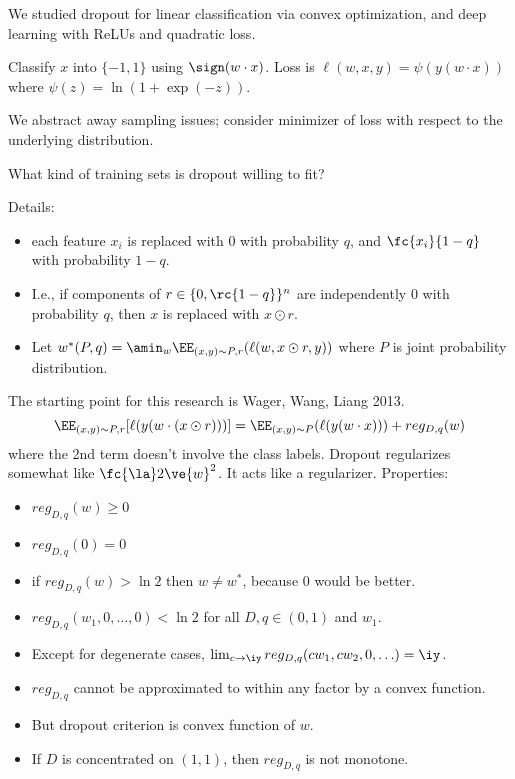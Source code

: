 We studied dropout for linear classification via convex optimization, and deep learning with ReLUs and quadratic loss.

Classify $x$ into $\{-1,1\}$ using $\sign(w\cdot x)$. Loss is $\ell(w,x,y) = \psi(y(w\cdot x))$ where $\psi(z) =\ln (1+\exp(-z))$.

We abstract away sampling issues; consider minimizer of loss with respect to the underlying distribution.

What kind of training sets is dropout willing to fit?

Details:
\begin{itemize}
\item
each feature $x_i$ is replaced with 0 with probability $q$, and $\fc{x_i}{1-q}$ with probability $1-q$.
\item
I.e., if components of $r\in \{0,\rc{1-q}\}^n$ are independently 0 with probability $q$, then $x$ is replaced with $x\odot r$.
\item
Let $w^*(P,q) = \amin_w \EE_{(x,y)\sim P,r} (\ell(w,x\odot r, y))$ where $P$ is joint probability distribution.
\end{itemize}
The starting point for this research is Wager, Wang, Liang 2013.
$$
\EE_{(x,y)\sim P,r} [\ell (y(w\cdot (x\odot r)))]= \EE_{(x,y)\sim P} (\ell(y(w\cdot x))) + reg_{D,q}(w)
$$
where the 2nd term doesn't involve the class labels.
Dropout regularizes somewhat like $\fc{\la}2\ve{w}^2$.
It acts like a regularizer. Properties:
\begin{itemize}
\item
$reg_{D,q}(w)\ge0$
\item
$reg_{D,q}(0)=0$
\item
if $reg_{D,q}(w) > \ln 2$ then $w\ne w^*$, because 0 would be better.
\item
$reg_{D,q}(w_1,0,\ldots, 0)<\ln 2$ for all $D,q\in (0,1)$ and $w_1$.
\item
Except for degenerate cases, $\lim_{c\to \iy}reg_{D,q}(cw_1,cw_2,0,\ldots)=\iy$.
\item
$reg_{D,q}$ cannot be approximated to within any factor by a convex function.
\item
But dropout criterion is convex function of $w$.
\item
If $D$ is concentrated on $(1,1)$, then $reg_{D,q}$ is not monotone.
\end{itemize}

